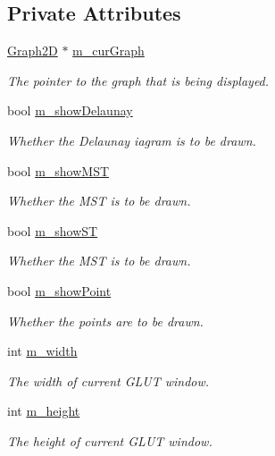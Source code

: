 \subsection*{Private Attributes}
\begin{DoxyCompactItemize}
\item 
\hyperlink{classcmst_1_1_graph2_d}{Graph2D} $\ast$ \hyperlink{classcmst_1_1_window_a86d6a605ac3dc593de030802009e73bc}{m\+\_\+cur\+Graph}
\begin{DoxyCompactList}\small\item\em The pointer to the graph that is being displayed. \end{DoxyCompactList}\item 
bool \hyperlink{classcmst_1_1_window_a527a10c574abe1ad1e0279465b07a7f0}{m\+\_\+show\+Delaunay}
\begin{DoxyCompactList}\small\item\em Whether the Delaunay iagram is to be drawn. \end{DoxyCompactList}\item 
bool \hyperlink{classcmst_1_1_window_a55136499feb82b469393b5f18bb1fe88}{m\+\_\+show\+M\+ST}
\begin{DoxyCompactList}\small\item\em Whether the M\+ST is to be drawn. \end{DoxyCompactList}\item 
bool \hyperlink{classcmst_1_1_window_a8d8b71a285b5730cac0ce3fe63c91baf}{m\+\_\+show\+ST}
\begin{DoxyCompactList}\small\item\em Whether the M\+ST is to be drawn. \end{DoxyCompactList}\item 
bool \hyperlink{classcmst_1_1_window_a10240817a263c467d61dad604c820f52}{m\+\_\+show\+Point}
\begin{DoxyCompactList}\small\item\em Whether the points are to be drawn. \end{DoxyCompactList}\item 
int \hyperlink{classcmst_1_1_window_a2955f1032cf2ab577a5f01776e46f671}{m\+\_\+width}
\begin{DoxyCompactList}\small\item\em The width of current G\+L\+UT window. \end{DoxyCompactList}\item 
int \hyperlink{classcmst_1_1_window_a9447754382ddb8894d50a40d19f027a3}{m\+\_\+height}
\begin{DoxyCompactList}\small\item\em The height of current G\+L\+UT window. \end{DoxyCompactList}\end{DoxyCompactItemize}
